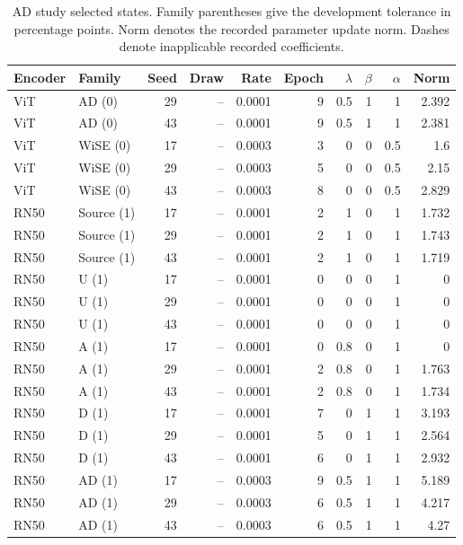 \begin{table}[t]
\centering
\scriptsize
\setlength{\tabcolsep}{3pt}
\begin{tabular}{llrrrrrrrr}
\toprule
Encoder & Family & Seed & Draw & Rate & Epoch & $\lambda$ & $\beta$ & $\alpha$ & Norm\\
\midrule
ViT & AD (0) & 29 & -- & 0.0001 & 9 & 0.5 & 1 & 1 & 2.392\\
ViT & AD (0) & 43 & -- & 0.0001 & 9 & 0.5 & 1 & 1 & 2.381\\
ViT & WiSE (0) & 17 & -- & 0.0003 & 3 & 0 & 0 & 0.5 & 1.6\\
ViT & WiSE (0) & 29 & -- & 0.0003 & 5 & 0 & 0 & 0.5 & 2.15\\
ViT & WiSE (0) & 43 & -- & 0.0003 & 8 & 0 & 0 & 0.5 & 2.829\\
RN50 & Source (1) & 17 & -- & 0.0001 & 2 & 1 & 0 & 1 & 1.732\\
RN50 & Source (1) & 29 & -- & 0.0001 & 2 & 1 & 0 & 1 & 1.743\\
RN50 & Source (1) & 43 & -- & 0.0001 & 2 & 1 & 0 & 1 & 1.719\\
RN50 & U (1) & 17 & -- & 0.0001 & 0 & 0 & 0 & 1 & 0\\
RN50 & U (1) & 29 & -- & 0.0001 & 0 & 0 & 0 & 1 & 0\\
RN50 & U (1) & 43 & -- & 0.0001 & 0 & 0 & 0 & 1 & 0\\
RN50 & A (1) & 17 & -- & 0.0001 & 0 & 0.8 & 0 & 1 & 0\\
RN50 & A (1) & 29 & -- & 0.0001 & 2 & 0.8 & 0 & 1 & 1.763\\
RN50 & A (1) & 43 & -- & 0.0001 & 2 & 0.8 & 0 & 1 & 1.734\\
RN50 & D (1) & 17 & -- & 0.0001 & 7 & 0 & 1 & 1 & 3.193\\
RN50 & D (1) & 29 & -- & 0.0001 & 5 & 0 & 1 & 1 & 2.564\\
RN50 & D (1) & 43 & -- & 0.0001 & 6 & 0 & 1 & 1 & 2.932\\
RN50 & AD (1) & 17 & -- & 0.0003 & 9 & 0.5 & 1 & 1 & 5.189\\
RN50 & AD (1) & 29 & -- & 0.0003 & 6 & 0.5 & 1 & 1 & 4.217\\
RN50 & AD (1) & 43 & -- & 0.0003 & 6 & 0.5 & 1 & 1 & 4.27\\
\bottomrule
\end{tabular}
\caption{AD study selected states. Family parentheses give the development tolerance in percentage points. Norm denotes the recorded parameter update norm. Dashes denote inapplicable recorded coefficients.}\label{tab:adselected40}
\end{table}


